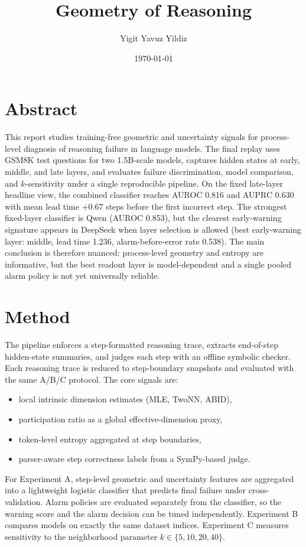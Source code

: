\documentclass{article}
\title{Geometry of Reasoning}
\author{Yigit Yavuz Yildiz}
\date{\today}
\begin{document}
\maketitle

\section{Abstract}
This report studies training-free geometric and uncertainty signals for process-level diagnosis of reasoning failure in language models. The final replay uses GSM8K test questions for two 1.5B-scale models, captures hidden states at early, middle, and late layers, and evaluates failure discrimination, model comparison, and $k$-sensitivity under a single reproducible pipeline. On the fixed late-layer headline view, the combined classifier reaches AUROC 0.816 and AUPRC 0.630 with mean lead time $+0.67$ steps before the first incorrect step. The strongest fixed-layer classifier is Qwen (AUROC 0.853), but the clearest early-warning signature appears in DeepSeek when layer selection is allowed (best early-warning layer: middle, lead time 1.236, alarm-before-error rate 0.538). The main conclusion is therefore nuanced: process-level geometry and entropy are informative, but the best readout layer is model-dependent and a single pooled alarm policy is not yet universally reliable.

\section{Method}
The pipeline enforces a step-formatted reasoning trace, extracts end-of-step hidden-state summaries, and judges each step with an offline symbolic checker. Each reasoning trace is reduced to step-boundary snapshots and evaluated with the same A/B/C protocol. The core signals are:

\begin{itemize}
    \item local intrinsic dimension estimates (MLE, TwoNN, ABID),
    \item participation ratio as a global effective-dimension proxy,
    \item token-level entropy aggregated at step boundaries,
    \item parser-aware step correctness labels from a SymPy-based judge.
\end{itemize}

For Experiment A, step-level geometric and uncertainty features are aggregated into a lightweight logistic classifier that predicts final failure under cross-validation. Alarm policies are evaluated separately from the classifier, so the warning score and the alarm decision can be tuned independently. Experiment B compares models on exactly the same dataset indices. Experiment C measures sensitivity to the neighborhood parameter $k \in \{5, 10, 20, 40\}$.
\end{document}
